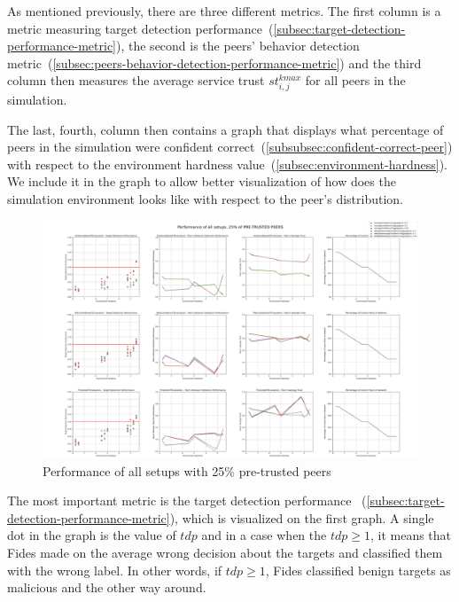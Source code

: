 As mentioned previously, there are three different metrics.
The first column is a metric measuring target detection performance~(\ref{subsec:target-detection-performance-metric}), the second is the peers' behavior detection metric~(\ref{subsec:peers-behavior-detection-performance-metric}) and the third column then measures the average service trust $st^{kmax}_{i, j}$ for all peers in the simulation.

The last, fourth, column then contains a graph that displays what percentage of peers in the simulation were confident correct~(\ref{subsubsec:confident-correct-peer}) with respect to the environment hardness value~(\ref{subsec:environment-hardness}).
We include it in the graph to allow better visualization of how does the simulation environment looks like with respect to the peer's distribution.

\begin{figure}[hp!]
    \centering
    \includegraphics[width=0.94\paperwidth, angle=90]{assets/25_all_metrics.png}
    \caption{Performance of all setups with 25\% pre-trusted peers}
    \label{fig:performance-all-setups-25-pretrusted}
\end{figure}

The most important metric is the target detection performance ~(\ref{subsec:target-detection-performance-metric}), which is visualized on the first graph.
A single dot in the graph is the value of $tdp$ and in a case when the $tdp \geq 1$, it means that Fides made on the average wrong decision about the targets and classified them with the wrong label.
In other words, if $tdp \geq 1$, Fides classified benign targets as malicious and the other way around.

